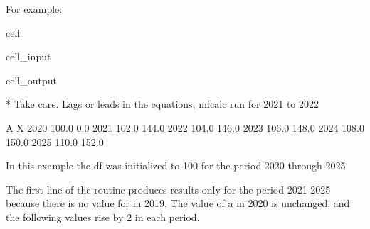 \documentclass[letterpaper,10pt,english]{jupyterBook}
\begin{document}
\sphinxAtStartPar
For example:

\begin{sphinxuseclass}{cell}\begin{sphinxVerbatimInput}

\begin{sphinxuseclass}{cell_input}
\begin{sphinxVerbatim}[commandchars=\\\{\}]
  


\end{sphinxVerbatim}

\end{sphinxuseclass}\end{sphinxVerbatimInput}
\begin{sphinxVerbatimOutput}

\begin{sphinxuseclass}{cell_output}
\begin{sphinxVerbatim}[commandchars=\\\{\}]
* Take care. Lags or leads in the equations, mfcalc run for 2021 to 2022
\end{sphinxVerbatim}

\begin{sphinxVerbatim}[commandchars=\\\{\}]
          A      X
2020  100.0    0.0
2021  102.0  144.0
2022  104.0  146.0
2023  106.0  148.0
2024  108.0  150.0
2025  110.0  152.0
\end{sphinxVerbatim}

\end{sphinxuseclass}\end{sphinxVerbatimOutput}

\end{sphinxuseclass}
\sphinxAtStartPar
In this example the  df was initialized to 100 for the period 2020 through 2025.

\sphinxAtStartPar
The first line of the  routine produces results only for the period 2021 \sphinxhyphen{} 2025 because there is no value for  in 2019.  The value of a in 2020 is unchanged, and the following values rise by 2 in each period.
\end{document}
